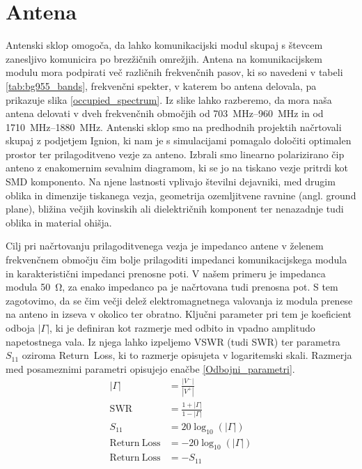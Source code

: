 \documentclass[a4paper,twoside,openright,12pt,slovene]{book}
\begin{document}
\section{Antena}
Antenski sklop omogoča, da lahko komunikacijski modul skupaj s števcem zanesljivo komunicira po brezžičnih omrežjih. Antena na komunikacijskem modulu mora podpirati več različnih frekvenčnih pasov, ki so navedeni v tabeli \ref{tab:bg955_bands}, frekvenčni spekter, v katerem bo antena delovala, pa prikazuje slika \ref{occupied_spectrum}. Iz slike lahko razberemo, da mora naša antena delovati v dveh frekvenčnih območjih od \SIrange{703}{960}{\mega\hertz} in od \SIrange{1710}{1880}{\mega\hertz}. Antenski sklop smo na predhodnih projektih načrtovali skupaj z podjetjem Ignion, ki nam je s simulacijami pomagalo določiti optimalen prostor ter prilagoditveno vezje za anteno. Izbrali smo linearno polarizirano čip anteno z enakomernim sevalnim diagramom, ki se jo na tiskano vezje pritrdi kot SMD komponento. Na njene lastnosti vplivajo številni dejavniki, med drugim oblika in dimenzije tiskanega vezja, geometrija ozemljitvene ravnine (angl. ground plane), bližina večjih kovinskih ali dielektričnih komponent ter nenazadnje tudi oblika in material ohišja.
\par Cilj pri načrtovanju prilagoditvenega vezja je impedanco antene v želenem frekvenčnem območju čim bolje prilagoditi impedanci komunikacijskega modula in karakteristični impedanci prenosne poti. V našem primeru je impedanca modula \SI{50}{\ohm}, za enako impedanco pa je načrtovana tudi prenosna pot. S tem zagotovimo, da se čim večji delež elektromagnetnega valovanja iz modula prenese na anteno in izseva v okolico ter obratno. Ključni parameter pri tem je koeficient odboja $\left|\Gamma\right|$, ki je definiran kot razmerje med odbito in vpadno amplitudo napetostnega vala. Iz njega lahko izpeljemo VSWR (tudi SWR) ter parametra $S_{11}$ oziroma Return\ Loss, ki to razmerje opisujeta v logaritemski skali. Razmerja med posameznimi parametri opisujejo enačbe \ref{Odbojni_parametri}.
\begin{equation} 
\begin{aligned}
|\Gamma|&=\frac{|V^-|}{|V^+|}  \\
\mathrm{SWR} &= \frac{1 + |\Gamma|}{1 - |\Gamma|} \\
S_{11}&=20\log_{10}\left(|\Gamma|\right) \\
\mathrm{Return\ Loss} &= -20\log_{10}\left(|\Gamma|\right) \\
\mathrm{Return\ Loss} &= -S_{11} 
\label{Odbojni_parametri}
\end{aligned}
\end{equation}
\end{document}
